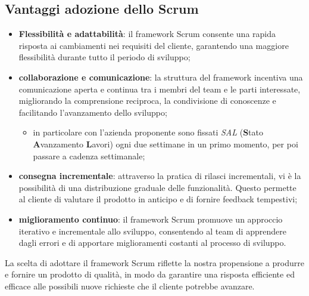 \subsection{Vantaggi adozione dello Scrum}
\begin{itemize}
    \item \textbf{Flessibilità e adattabilità}: il framework Scrum consente una rapida risposta ai cambiamenti nei requisiti del cliente, garantendo una maggiore flessibilità durante tutto il periodo di sviluppo;
    \item \textbf{collaborazione e comunicazione}: la struttura del framework incentiva una comunicazione aperta e continua tra i membri del team e le parti interessate, migliorando la comprensione reciproca, la condivisione di conoscenze e facilitando l'avanzamento dello sviluppo;
    \begin{itemize}
        \item in particolare con l’azienda proponente sono fissati \textit{SAL} (\textbf{S}tato \textbf{A}vanzamento \textbf{L}avori) ogni due settimane in un primo momento, per poi passare a cadenza settimanale;
    \end{itemize}
    \item \textbf{consegna incrementale}: attraverso la pratica di rilasci incrementali, vi è la possibilità di una distribuzione graduale delle funzionalità. Questo permette al cliente di valutare il prodotto in anticipo e di fornire feedback tempestivi;
    \item \textbf{miglioramento continuo}: il framework Scrum promuove un approccio iterativo e incrementale allo sviluppo, consentendo al team di apprendere dagli errori e di apportare miglioramenti costanti al processo di sviluppo.
\end{itemize}
La scelta di adottare il framework Scrum riflette la nostra propensione a produrre e fornire un prodotto di qualità, in modo da garantire una risposta efficiente ed efficace alle possibili nuove richieste che il cliente potrebbe avanzare.

